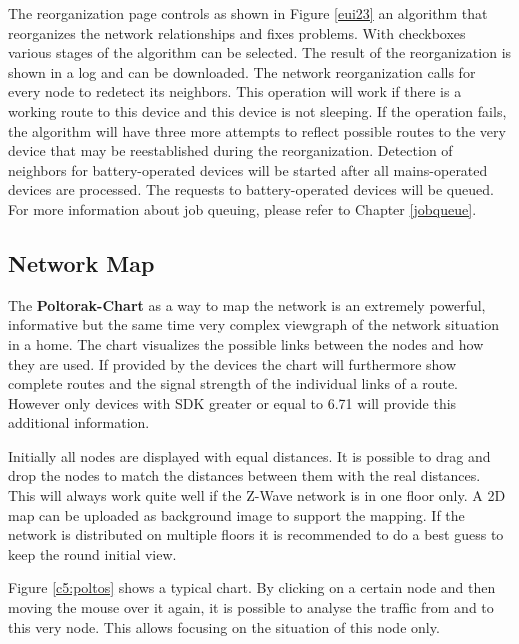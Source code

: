 The reorganization page controls as shown in Figure \ref{eui23} an algorithm that 
reorganizes the network relationships and fixes problems. With checkboxes various stages 
of the algorithm can be selected. The result of the reorganization is shown in a log and 
can be downloaded. The network reorganization calls for every node to redetect its neighbors. 
This operation will work if there is a working route to this device and this device is 
not sleeping. If the operation fails, the algorithm will have three more attempts to 
reflect possible routes to the very device that may be reestablished during the 
reorganization. Detection of neighbors for battery-operated devices will be started after 
all mains-operated devices are processed. The requests to battery-operated devices will 
be queued. For more information about job queuing, please refer to Chapter \ref{jobqueue}.

\subsection{Network Map}

The \textbf{Poltorak-Chart} as a way to map the network is an extremely powerful, informative but the same time very complex
viewgraph of the network situation in a home.  The chart visualizes the possible links between
the nodes and how they are used. If provided by the devices the chart will furthermore show
complete routes and the signal strength of the individual links of a route. However only 
devices with SDK greater or equal to 6.71 will provide this additional information.
 
Initially all nodes are displayed with equal distances. It is possible to drag and drop
the nodes to match the distances between them with the real distances. This will always 
work quite well if the Z-Wave network is in one floor only. 
A 2D map can be uploaded as background image to support the mapping.
If the network is distributed  on multiple floors it is recommended to do a best guess 
to keep the round initial view.

Figure \ref{c5:poltos} shows a typical chart. By clicking on a certain node and then 
moving the mouse over it again, it is possible to analyse the traffic from and to this 
very node. This allows focusing on the situation of this node only.


